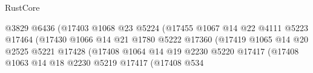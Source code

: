 \begin{lexlean}{RustCore}
\begin{coremodule}
                                                @3829
                                                @6436
                                                (@17403
                                                  @1068
                                                  @23
                                                  @5224
                                                  (@17455
                                                    @1067
                                                    @14
                                                    @22
                                                    @4111
                                                    @5223
                                                    @17464
                                                    (@17430
                                                      @1066
                                                      @14
                                                      @21
                                                      @1780
                                                      @5222
                                                      @17360
                                                      (@17419
                                                        @1065
                                                        @14
                                                        @20
                                                        @2525
                                                        @5221
                                                        @17428
                                                        (@17408
                                                          @1064
                                                          @14
                                                          @19
                                                          @2230
                                                          @5220
                                                          @17417
                                                          (@17408
                                                            @1063
                                                            @14
                                                            @18
                                                            @2230
                                                            @5219
                                                            @17417
                                                            (@17408
                                                              @534

\end{coremodule}
\end{lexlean}
